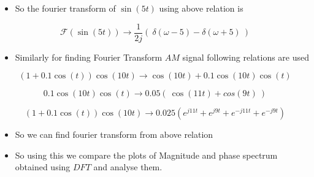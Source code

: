 \documentclass[11pt, a4paper]{article}
\begin{document}
\begin{itemize}

\item
  So the fourier transform of \(\sin(5t)\) using above relation is
\end{itemize}

\begin{equation}
\mathscr{F}({\sin(5t)})  \to \frac{1}{2j}(\ \delta(\omega -5) - \delta(\omega+5) \ ) 
\end{equation}

\begin{itemize}

\item
  Similarly for finding Fourier Transform \(AM\) signal following
  relations are used
\end{itemize}

\begin{equation}
\left(1+0.1\cos\left(t\right)\right)\cos\left(10t\right) \to \cos(10t)+0.1\cos(10t)\cos(t)
\end{equation}

\begin{equation}
0.1\cos(10t)\cos(t) \to 0.05(\ \cos(11t) +cos(9t) \ )
\end{equation}

\begin{equation}
\left(1+0.1\cos\left(t\right)\right)\cos\left(10t\right) \to 0.025(e^{j11t} + e^{j9t} + e^{−j11t} + e^{-j9t})
\end{equation}

\begin{itemize}

\item
  So we can find fourier transform from above relation
\item
  So using this we compare the plots of Magnitude and phase spectrum
  obtained using \(DFT\) and analyse them.
\end{itemize}
\end{document}
